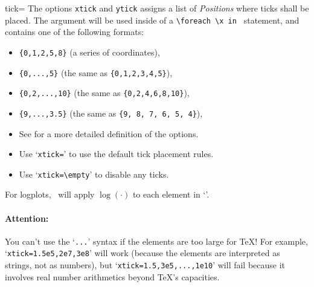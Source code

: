 \begin{pgfplotsxykey}{\x tick=}
The options \texttt{xtick} and \texttt{ytick} assigns a list of \emph{Positions} where ticks shall be placed. The argument  will be used inside of a \lstinline!\foreach \x in ! statement, and  contains one of the following formats:
\begin{itemize}
	\item \lstinline!{0,1,2,5,8}! (a series of coordinates),
	\item \lstinline!{0,...,5}! (the same as \lstinline!{0,1,2,3,4,5}!),
	\item \lstinline!{0,2,...,10}! (the same as \lstinline!{0,2,4,6,8,10}!),
	\item \lstinline!{9,...,3.5}! (the same as \lstinline!{9, 8, 7, 6, 5, 4}!),
	\item See \cite[Section~34]{tikz} for a more detailed definition of the options.
	\item Use `\texttt{xtick=}' to use the default tick placement rules.
	\item Use `\lstinline!xtick=\empty!' to disable any ticks.
\end{itemize}
For logplots, \PGFPlots\ will apply $\log(\cdot)$ to each element in `'. 
\begin{codeexample}[]
\begin{tikzpicture}
	\begin{loglogaxis}[xtick={12,9897,1468864}]
	\plotcoords
	\end{loglogaxis}
\end{tikzpicture}
\end{codeexample}

\begin{codeexample}[]
\end{codeexample}

\paragraph{Attention:} You can't use the `\texttt{...}' syntax if the elements are too large for \TeX! For example, `\texttt{xtick=1.5e5,2e7,3e8}' will work (because the elements are interpreted as strings, not as numbers), but `\texttt{xtick=1.5,3e5,...,1e10}' will fail because it involves real number arithmetics beyond \TeX's capacities.
\vspace*{0.3cm}


\end{pgfplotsxykey}
